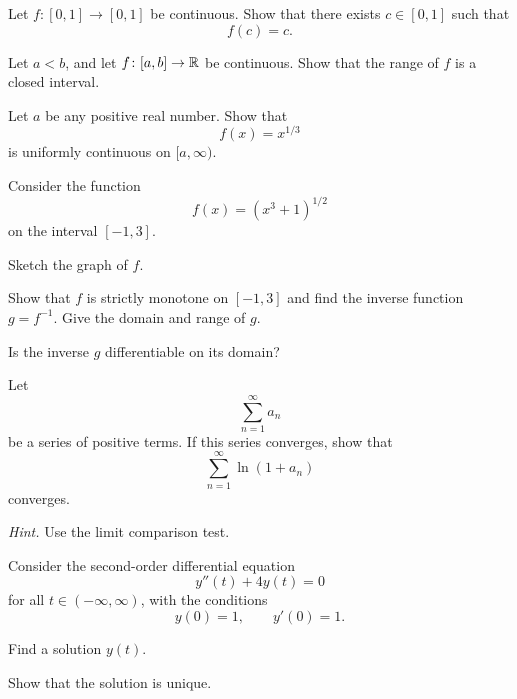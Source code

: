 \begin{problem}
Let $f\colon[0,1]\to[0,1]$ be continuous. Show that there exists $c\in[0,1]$ such that
\[
f(c)=c.
\]
\end{problem}

\begin{problem}
Let $a<b$, and let $f\colon[a,b]\to\mathbb{R}$ be continuous. Show that the range of $f$ is a closed interval.
\end{problem}

\begin{problem}
Let $a$ be any positive real number. Show that
\[
f(x)=x^{1/3}
\]
is uniformly continuous on $[a,\infty)$.
\end{problem}

\begin{problem}
Consider the function
\[
f(x)=(x^3+1)^{1/2}
\]
on the interval $[-1,3]$.
\begin{problemsubparts}
\item Sketch the graph of $f$.
\item Show that $f$ is strictly monotone on $[-1,3]$ and find the inverse function $g=f^{-1}$. Give the domain and range of $g$.
\item Is the inverse $g$ differentiable on its domain?
\end{problemsubparts}
\end{problem}

\begin{problem}
Let
\[
\sum_{n=1}^{\infty}a_n
\]
be a series of positive terms. If this series converges, show that
\[
\sum_{n=1}^{\infty}\ln(1+a_n)
\]
converges.

\textit{Hint.} Use the limit comparison test.
\end{problem}

\begin{problem}
Consider the second-order differential equation
\[
y''(t)+4y(t)=0
\]
for all $t\in(-\infty,\infty)$, with the conditions
\[
y(0)=1,
\qquad
y'(0)=1.
\]
\begin{problemsubparts}
\item Find a solution $y(t)$.
\item Show that the solution is unique.
\end{problemsubparts}
\end{problem}

